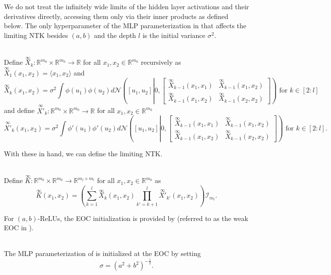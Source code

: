 \documentclass[twoside,11pt]{article}
\newcommand{\R}{\mathbb{R}}
\newcommand{\Id}{\mathcal{I}}
\newcommand{\limiting}[1]{\overset{\scriptscriptstyle\infty}{#1}}
\begin{document}
We do not treat the infinitely wide limits of the hidden layer activations and their derivatives directly, accessing them only via their inner products as defined below. The only hyperparameter of the MLP parameterization in \citet{mlpsateoc2} that affects the limiting NTK besides $(a,b)$ and the depth $l$ is the initial variance $\sigma^2$.

\begin{definition}~\\
Define $\limiting{X}_k : \R^{m_0} \times \R^{m_0} \to \R$ for all $x_1,x_2 \in \R^{m_0}$ recursively as $\limiting{X}_1(x_1,x_2) = \langle x_1, x_2 \rangle$ and
\[
\limiting{X}_k(x_1,x_2) = \sigma^2 \int \phi(u_1) \phi(u_2) d\mathcal{N}\left( [u_1,u_2] \left\vert 0,\left[ \begin{smallmatrix} \limiting{X}_{k-1}(x_1,x_1) & \limiting{X}_{k-1}(x_1,x_2) \\ \limiting{X}_{k-1}(x_1,x_2) & \limiting{X}_{k-1}(x_2,x_2) \end{smallmatrix} \right] \right. \right) \text{ for } k \in [2:l]
\]
and define $\limiting{X'}_k : \R^{m_0} \times \R^{m_0} \to \R$ for all $x_1,x_2 \in \R^{m_0}$
\[
\limiting{X'}_k(x_1,x_2) = \sigma^2 \int \phi'(u_1) \phi'(u_2) d\mathcal{N}\left( [u_1,u_2] \left\vert 0,\left[ \begin{smallmatrix} \limiting{X}_{k-1}(x_1,x_1) & \limiting{X}_{k-1}(x_1,x_2) \\ \limiting{X}_{k-1}(x_1,x_2) & \limiting{X}_{k-1}(x_2,x_2) \end{smallmatrix} \right] \right. \right) \text{ for } k \in [2:l].
\]
\end{definition}

With these in hand, we can define the limiting NTK.

\begin{definition}~\\
Define $\limiting{K} : \R^{m_0} \times \R^{m_0} \to \R^{m_l \times m_l}$ for all $x_1,x_2 \in \R^{m_0}$ as
\[
\limiting{K}(x_1,x_2)
= \left( \sum_{k=1}^l \limiting{X}_k(x_1,x_2) \prod_{k'=k+1}^l \limiting{X'}_{k'}(x_1,x_2) \right) \Id_{m_l}.
\]
\end{definition}

For $(a,b)$-ReLUs, the EOC initialization is provided by \citet[Lemma~3]{Hayouetal2019} (referred to as the weak EOC in \citet{Hayouetal2019}).

\begin{definition}\label{def:eoc_parameterization}~\\
The MLP parameterization of \citet{mlpsateoc2} is initialized at the EOC by setting
\[
\sigma = (a^2 + b^2)^{-\frac{1}{2}}.
\]
\end{definition}
\end{document}
